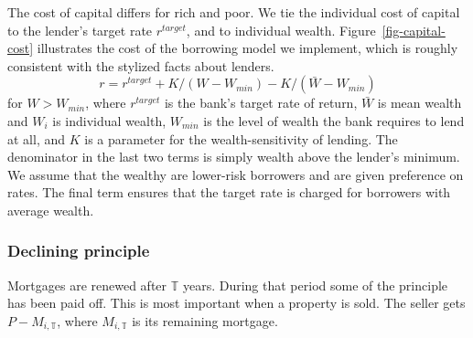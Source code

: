 {The cost of capital differs for rich and poor. We tie the individual cost of capital %
to the lender's target rate $r^{target}$, and to individual wealth. Figure~\ref{fig-capital-cost} illustrates the cost of the borrowing model we implement, which is roughly consistent with the stylized facts about lenders. 
\begin{equation}
{r} = r^{target}+ K/(W-W_{min}) -K/(\bar W - W_{min})\label{eqn-interest-wealth-relationship}
\end{equation}
for $W>W_{min}$, where  $r^{target}$ is the bank's target rate of return,  $\bar{W}$ is mean wealth and $W_i$ is individual wealth, $W_{min}$ is the level of wealth the bank requires to lend at all, and $K$ is a parameter for the wealth-sensitivity of lending. The denominator in the last two terms is simply wealth above the lender's minimum. We assume that the wealthy are lower-risk borrowers and are given preference on rates. The final term ensures that the target rate is charged for borrowers with average wealth.





\subsubsection{Declining principle}\label{sec:declining-principle}

Mortgages are renewed after $\mathbb{T}$ years. During that period some of the principle has been paid off. This is most important when a property is sold. The seller gets $P-M_{i,\mathbb{T}}$, where  $M_{i,\mathbb{T}}$ is its remaining mortgage.



}
